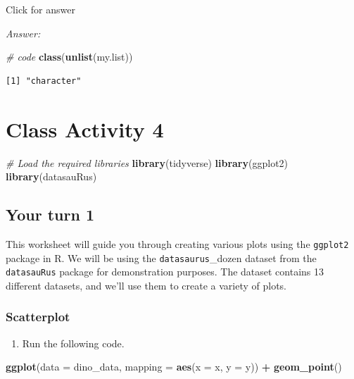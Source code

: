 \documentclass[
]{book}
\newenvironment{Shaded}{\begin{snugshade}}{\end{snugshade}}
\newcommand{\AttributeTok}[1]{\textcolor[rgb]{0.13,0.29,0.53}{#1}}
\newcommand{\CommentTok}[1]{\textcolor[rgb]{0.56,0.35,0.01}{\textit{#1}}}
\newcommand{\FunctionTok}[1]{\textcolor[rgb]{0.13,0.29,0.53}{\textbf{#1}}}
\newcommand{\NormalTok}[1]{#1}
\newcommand{\SpecialCharTok}[1]{\textcolor[rgb]{0.81,0.36,0.00}{\textbf{#1}}}
\providecommand{\tightlist}{%
  \setlength{\itemsep}{0pt}\setlength{\parskip}{0pt}}
\begin{document}
Click for answer

\emph{Answer:}

\begin{Shaded}
\begin{Highlighting}[]
\CommentTok{\# code}
\FunctionTok{class}\NormalTok{(}\FunctionTok{unlist}\NormalTok{(my.list))}
\end{Highlighting}
\end{Shaded}

\begin{verbatim}
[1] "character"
\end{verbatim}

\hypertarget{class-activity-4}{%
\chapter{Class Activity 4}\label{class-activity-4}}

\begin{Shaded}
\begin{Highlighting}[]
\CommentTok{\# Load the required libraries}
\FunctionTok{library}\NormalTok{(tidyverse)}
\FunctionTok{library}\NormalTok{(ggplot2)}
\FunctionTok{library}\NormalTok{(datasauRus)}
\end{Highlighting}
\end{Shaded}

\hypertarget{your-turn-1}{%
\section{Your turn 1}\label{your-turn-1}}

This worksheet will guide you through creating various plots using the \texttt{ggplot2} package in R. We will be using the \texttt{datasaurus}\_dozen dataset from the \texttt{datasauRus} package for demonstration purposes. The dataset contains 13 different datasets, and we'll use them to create a variety of plots.

\hypertarget{scatterplot}{%
\subsection{Scatterplot}\label{scatterplot}}

\begin{enumerate}
\def\labelenumi{\alph{enumi}.}
\tightlist
\item
  Run the following code.
\end{enumerate}

\begin{Shaded}
\begin{Highlighting}[]
\FunctionTok{ggplot}\NormalTok{(}\AttributeTok{data =}\NormalTok{ dino\_data, }\AttributeTok{mapping =} \FunctionTok{aes}\NormalTok{(}\AttributeTok{x =}\NormalTok{ x, }\AttributeTok{y =}\NormalTok{ y)) }\SpecialCharTok{+}
  \FunctionTok{geom\_point}\NormalTok{()}
\end{Highlighting}
\end{Shaded}
\end{document}
